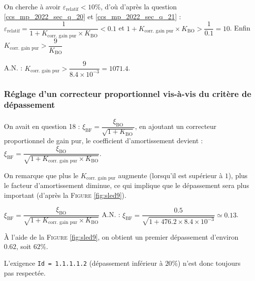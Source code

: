 \ifprof
\begin{corrige}
On cherche à avoir $\varepsilon_\text{relatif} < 10\%$, d'où d'après la question \ref{ccs_mp_2022_sec_q_20} et \ref{ccs_mp_2022_sec_q_21} :
$ \varepsilon_\text{relatif} = \dfrac{1}{1 + K_\text{corr. gain pur} \times K_\text{BO}} < 0.1$
et $  1 + K_\text{corr. gain pur} \times K_\text{BO}  > \dfrac{1}{0.1} = 10$. Enfin 
$ K_\text{corr. gain pur} > \dfrac{9}{K_\text{BO}}$

A.N. : $ K_\text{corr. gain pur} > \dfrac{9}{8.4\times 10^{-3}} = 1071.4$.\end{corrige}
\else
\fi



\subsubsection{Réglage d'un correcteur proportionnel vis-à-vis du critère de dépassement \label{ccs_mp_2022_sec_3B2}}
\ifprof
\begin{corrige}
On avait en question 18 : $\xi_\text{BF} = \dfrac{\xi_\text{BO}}{\sqrt{1 + K_\text{BO}}}$, en ajoutant un correcteur proportionnel de gain pur, le coefficient d'amortissement devient :
$ \xi_\text{BF} = \dfrac{\xi_\text{BO}}{\sqrt{1 + K_\text{corr. gain pur} \times K_\text{BO}}}$.

On remarque que plus le $K_\text{corr. gain pur}$ augmente (lorsqu'il est supérieur à $1$), plus le facteur d'amortissement diminue, ce qui implique que le dépassement sera plus important (d'après la \textsc{Figure} \ref{fig:sled9}).
\end{corrige}
\else
\fi


\ifprof
\begin{corrige}
$ \xi_\text{BF} = \dfrac{\xi_\text{BO}}{\sqrt{1 + K_\text{corr. gain pur} \times K_\text{BO}}} $
A.N. : $ \xi_\text{BF} = \dfrac{0.5}{\sqrt{1 + 476.2 \times 8.4 \times 10^{-3}}} \simeq  0.13 $.

\`A l'aide de la \textsc{Figure} \ref{fig:sled9}, on obtient un premier dépassement d'environ $0.62$, soit $62\%$.

L'exigence \texttt{Id = 1.1.1.1.2} (dépassement inférieur à $20\%$) n'est donc toujours pas respectée.

\end{corrige}
\else
\fi


